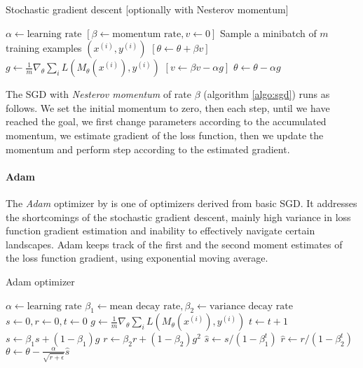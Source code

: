 \begin{algorithm}
\label{algo:sgd}
\caption{Stochastic gradient descent [optionally with Nesterov momentum]}
\begin{algorithmic}
\STATE $\alpha \gets \text{learning rate}$
\STATE $[\beta \gets \text{momentum rate}, v \gets 0]$
\REPEAT
\STATE Sample a minibatch of $m$ training examples $(x^{(i)}, y^{(i)})$
\STATE $[\theta \gets \theta + \beta v]$
\STATE $g \gets \frac{1}{m} \nabla_\theta \sum_i L(M_\theta(x^{(i)}),y^{(i)})$
\STATE $[v \gets \beta v - \alpha g]$
\STATE $\theta \gets \theta - \alpha g$
\end{algorithmic}
\end{algorithm}

\noindent The SGD with \emph{Nesterov momentum} of rate $\beta$ (algorithm \ref{algo:sgd}) runs as follows. We set the initial momentum to zero, then each step, until we have reached the goal, we first change parameters according to the accumulated momentum, we estimate gradient of the loss function, then we update the momentum and perform step according to the estimated gradient.

\paragraph{Adam}

The \emph{Adam} optimizer by \cite{DBLP:journals/corr/KingmaB14} is one of optimizers derived from basic SGD. It addresses the shortcomings of the stochastic gradient descent, mainly high variance in loss function gradient estimation and inability to effectively navigate certain landscapes. Adam keeps track of the first and the second moment estimates of the loss function gradient, using exponential moving average.

\begin{algorithm}
\label{algo:adam}
\caption{Adam optimizer}
\begin{algorithmic}
\STATE $\alpha \gets \text{learning rate}$
\STATE $\beta_1 \gets \text{mean decay rate}, \beta_2 \gets \text{variance decay rate}$
\STATE $s \gets 0, r \gets 0, t \gets 0$
\REPEAT
\STATE $g \gets \frac{1}{m} \nabla_\theta \sum_i L(M_\theta(x^{(i)}),y^{(i)})$
\STATE $t \gets t + 1$
\STATE $s \gets \beta_1 s + (1 - \beta_1)g$
\STATE $r \gets \beta_2 r + (1 - \beta_2)g^2$
\STATE $\hat{s} \gets s / (1 - \beta_1^t)$
\STATE $\hat{r} \gets r / (1 - \beta_2^t)$
\STATE $\theta \gets \theta - \frac{\alpha}{\sqrt{\hat{r} + \epsilon}} \hat{s}$
\end{algorithmic}
\end{algorithm}


